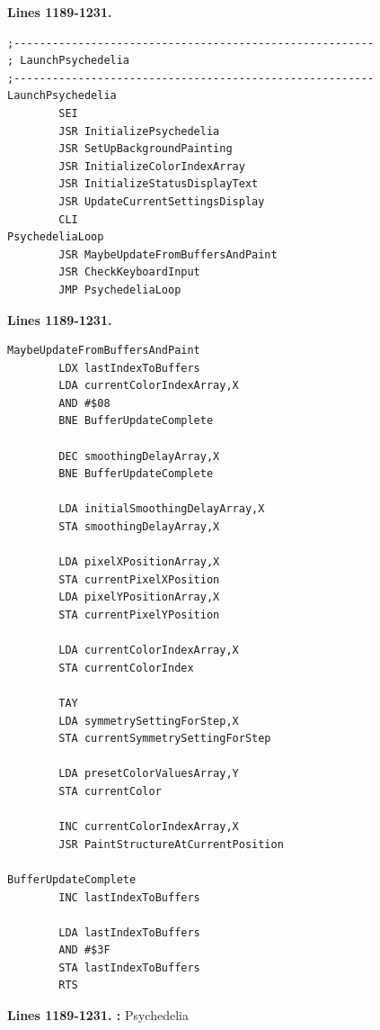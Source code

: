 

\clearpage
\textbf{Lines 1189-1231. } 
\begin{lstlisting}
;--------------------------------------------------------
; LaunchPsychedelia
;--------------------------------------------------------
LaunchPsychedelia
        SEI 
        JSR InitializePsychedelia
        JSR SetUpBackgroundPainting
        JSR InitializeColorIndexArray
        JSR InitializeStatusDisplayText
        JSR UpdateCurrentSettingsDisplay
        CLI 
PsychedeliaLoop   
        JSR MaybeUpdateFromBuffersAndPaint
        JSR CheckKeyboardInput
        JMP PsychedeliaLoop
\end{lstlisting}
\textbf{Lines 1189-1231. } 
\begin{lstlisting}[basicstyle=\ttfamily\scriptsize, caption=The routine responsible for painting patterns.]
MaybeUpdateFromBuffersAndPaint   
        LDX lastIndexToBuffers
        LDA currentColorIndexArray,X
        AND #$08
        BNE BufferUpdateComplete

        DEC smoothingDelayArray,X
        BNE BufferUpdateComplete

        LDA initialSmoothingDelayArray,X
        STA smoothingDelayArray,X

        LDA pixelXPositionArray,X
        STA currentPixelXPosition
        LDA pixelYPositionArray,X
        STA currentPixelYPosition

        LDA currentColorIndexArray,X
        STA currentColorIndex

        TAY 
        LDA symmetrySettingForStep,X
        STA currentSymmetrySettingForStep

        LDA presetColorValuesArray,Y
        STA currentColor

        INC currentColorIndexArray,X
        JSR PaintStructureAtCurrentPosition

BufferUpdateComplete   
        INC lastIndexToBuffers

        LDA lastIndexToBuffers
        AND #$3F
        STA lastIndexToBuffers
        RTS 
\end{lstlisting}
\clearpage

\textbf{Lines 1189-1231. :} Psychedelia


